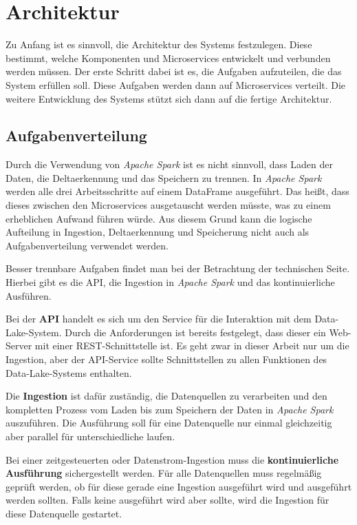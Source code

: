 \section{Architektur}
\label{sec:arch}

Zu Anfang ist es sinnvoll, die Architektur des Systems festzulegen.
Diese bestimmt, welche Komponenten und Microservices entwickelt und verbunden werden müssen.
Der erste Schritt dabei ist es, die Aufgaben aufzuteilen, die das System erfüllen soll.
Diese Aufgaben werden dann auf Microservices verteilt.
Die weitere Entwicklung des Systems stützt sich dann auf die fertige Architektur.

\subsection{Aufgabenverteilung}
Durch die Verwendung von \textit{Apache Spark} ist es nicht sinnvoll, dass Laden der Daten, die Deltaerkennung und das Speichern zu trennen.
In \textit{Apache Spark} werden alle drei Arbeitsschritte auf einem DataFrame ausgeführt.
Das heißt, dass dieses zwischen den Microservices ausgetauscht werden müsste, was zu einem erheblichen Aufwand führen würde.
Aus diesem Grund kann die logische Aufteilung in Ingestion, Deltaerkennung und Speicherung nicht auch als Aufgabenverteilung verwendet werden.

Besser trennbare Aufgaben findet man bei der Betrachtung der technischen Seite.
Hierbei gibt es die API, die Ingestion in \textit{Apache Spark} und das kontinuierliche Ausführen.

Bei der \textbf{API} handelt es sich um den Service für die Interaktion mit dem Data-Lake-System.
Durch die Anforderungen ist bereits festgelegt, dass dieser ein Web-Server mit einer REST-Schnittstelle ist.
Es geht zwar in dieser Arbeit nur um die Ingestion, aber der API-Service sollte Schnittstellen zu allen Funktionen des Data-Lake-Systems enthalten.

Die \textbf{Ingestion} ist dafür zuständig, die Datenquellen zu verarbeiten und den kompletten Prozess vom Laden bis zum Speichern der Daten in \textit{Apache Spark} auszuführen.
Die Ausführung soll für eine Datenquelle nur einmal gleichzeitig aber parallel für unterschiedliche laufen.

Bei einer zeitgesteuerten oder Datenstrom-Ingestion muss die \textbf{kontinuierliche Ausführung} sichergestellt werden.
Für alle Datenquellen muss regelmäßig geprüft werden, ob für diese gerade eine Ingestion ausgeführt wird und ausgeführt werden sollten.
Falls keine ausgeführt wird aber sollte, wird die Ingestion für diese Datenquelle gestartet.

